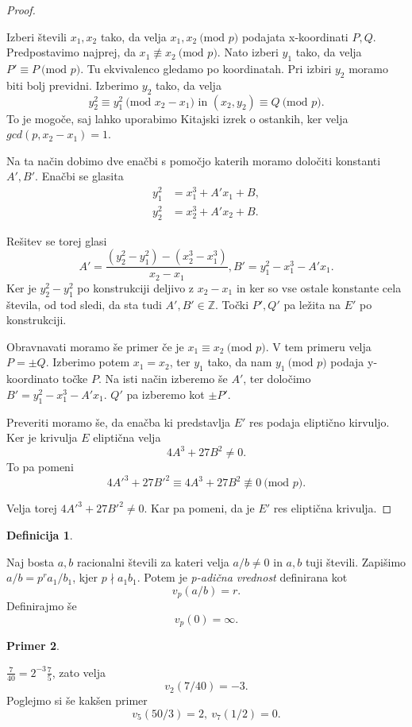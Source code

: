 \documentclass[12pt,a4paper,twoside]{article}
\theoremstyle{definition} %
\newtheorem{definicija}{Definicija}[section]
\newtheorem{primer}[definicija]{Primer}
\theoremstyle{plain} %
\numberwithin{equation}{section}  %
\newcommand{\Z}{\mathbb Z}
\newcommand{\MOD}[1]{\ \text{(mod }{#1}\text{)}}
\begin{document}
\begin{proof}~

Izberi števili $x_1,x_2$ tako, da velja $x_1,x_2 \MOD{p}$ podajata x-koordinati $P,Q$. Predpostavimo najprej, da $x_1 \not \equiv x_2 \MOD{p}$. Nato izberi $y_1$ tako, da velja
$P' \equiv P \MOD{p}$. Tu ekvivalenco gledamo po koordinatah. Pri izbiri $y_2$ moramo biti bolj previdni. Izberimo $y_2$ tako, da velja
$$y_2^2\equiv y_1^2 \MOD{x_2-x_1} \text{ in } (x_2,y_2) \equiv Q \MOD{p}.$$
To je mogoče, saj lahko uporabimo Kitajski izrek o ostankih, ker velja $gcd(p,x_2-x_1) = 1$.

Na ta način dobimo dve enačbi s pomočjo katerih moramo določiti konstanti $A',B'$.
Enačbi se glasita
\begin{align}
y_1^2&{}=x_1^3+A'x_1+B, \nonumber  \\
y_2^2&{}=x_2^3+A'x_2+B. \nonumber
\end{align}

Rešitev se torej glasi
$$A' = \frac{(y_2^2-y_1^2)-(x_2^3-x_1^3)}{x_2-x_1}, B' = y_1^2-x_1^3-A'x_1.$$
Ker je $y_2^2-y_1^2$ po konstrukciji deljivo z $x_2-x_1$ in ker so vse ostale konstante cela števila, od tod sledi, da sta tudi $A',B' \in \Z$. Točki $P',Q'$ pa ležita na $E'$ po konstrukciji.

Obravnavati moramo še primer če je $x_1 \equiv x_2 \MOD{p}$. V tem primeru velja $P = \pm Q$. Izberimo potem $x_1 = x_2$, ter $y_1$ tako, da nam $y_1 \MOD{p}$ podaja y-koordinato točke $P$. Na isti način izberemo še $A'$, ter določimo $B' = y_1^2-x_1^3-A'x_1$. $Q'$ pa izberemo kot $\pm P'$.

Preveriti moramo še, da enačba ki predstavlja $E'$ res podaja eliptično kirvuljo. Ker je krivulja $E$ eliptična velja
$$4A^3+27B^2 \neq 0.$$
To pa pomeni
$$4A'^3+27B'^2 \equiv 4A^3+27B^2 \not \equiv 0 \MOD{p}.$$

Velja torej $4A'^3+27B'^2 \neq 0$. Kar pa pomeni, da je $E'$ res eliptična krivulja.
\end{proof}


\begin{definicija}~

Naj bosta $a,b$ racionalni števili za kateri velja $a/b \neq 0$ in $a,b$ tuji števili. Zapišimo $a/b = p^ra_1/b_1$, kjer $p \nmid a_1b_1$. Potem je \emph{p-adična vrednost} definirana
kot
$$v_p(a/b) = r.$$
Definirajmo še
$$v_p(0) = \infty.$$
\end{definicija}

\begin{primer}~

$\frac{7}{40} = 2^{-3}\frac{7}{5}$, zato velja
$$v_2(7/40) = -3.$$
Poglejmo si še kakšen primer
$$v_5(50/3) = 2,\ v_7(1/2) = 0.$$
\end{primer}
\end{document}
